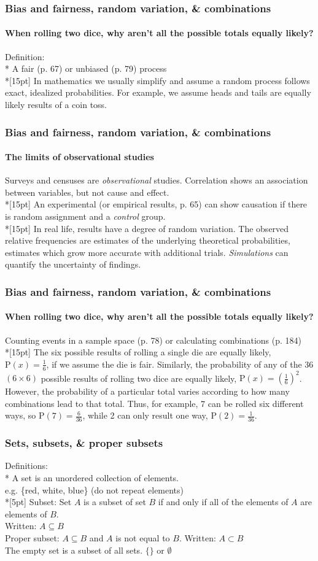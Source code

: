 \documentclass{beamer}
\begin{document}
\frame
{
  \frametitle{Bias and fairness, random variation, \& combinations}
  \framesubtitle{When rolling two dice, why aren't all the possible totals equally likely?}
  Definition:\\*
  A \alert{fair} (p. 67) or \alert{unbiased} (p. 79) process \\*[15pt]
  In mathematics we usually simplify and assume a random process follows exact, idealized probabilities. For example, we assume heads and tails are equally likely results of a coin toss.
  
}

\frame
{
  \frametitle{Bias and fairness, random variation, \& combinations}
  \framesubtitle{The limits of observational studies}
  Surveys and censuses are \emph{observational} studies. Correlation shows an association between variables, but not cause and effect.\\*[15pt]
  An \alert{experimental} (or \alert{empirical} results, p. 65) can show causation if there is random assignment and a \emph{control} group.\\*[15pt]
  In real life,  results have a degree of \alert{random variation}. The observed relative frequencies are estimates of the underlying theoretical probabilities, estimates which grow more accurate with additional trials. \emph{Simulations} can quantify the uncertainty of findings.
  
}

\frame
{
  \frametitle{Bias and fairness, random variation, \& combinations}
  \framesubtitle{When rolling two dice, why aren't all the possible totals equally likely?}
  Counting events in a \alert{sample space} (p. 78) or calculating \alert{combinations} (p. 184) \\*[15pt]
  The six possible results of rolling a single die are equally likely, $\mathrm P(x)=\frac{1}{6}$, if we assume the die is fair. Similarly, the probability of any of the 36 $(6 \times 6)$ possible results of rolling two dice are equally likely, $\mathrm P(x)=(\frac{1}{6})^2$. However, the probability of a particular total varies according to how many combinations lead to that total. Thus, for example, 7 can be rolled six different ways, so $\mathrm P(7)=\frac{6}{36}$, while 2 can only result one way, $\mathrm P(2)=\frac{1}{36}$.
  
}

\frame
{
  \frametitle{Sets, subsets, \& proper subsets}
  
  Definitions:\\*
  A \alert{set} is an unordered collection of elements.\\ e.g. \{red, white, blue\} (do not repeat elements)\\*[5pt]
  \alert{Subset}: Set $A$ is a subset of set $B$ if and only if all of the elements of $A$ are elements of $B$.\\
  Written: $A \subseteq B$\\[5pt]
  \alert{Proper subset}: $A \subseteq B$ and $A$ is not equal to $B$. Written: $A \subset B$\\[5pt]
  The \alert{empty set} is a subset of all sets. $\{\} \text{ or } \emptyset$
  
}
\end{document}
